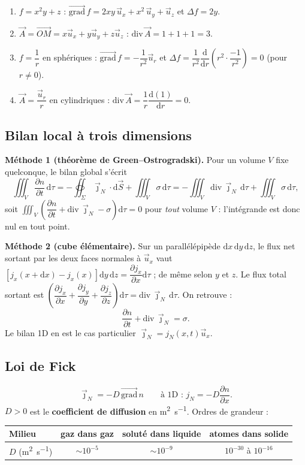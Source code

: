 \documentclass[11pt,a4paper]{article}
\newcommand{\vect}[1]{\overrightarrow{#1}}
\newcommand{\jn}{\vec{\jmath}_N}
\newcommand{\grad}{\vect{\mathrm{grad}}\,}
\renewcommand{\div}{\mathrm{div}\,}
\newcommand{\dd}{\mathrm{d}}
\newcommand{\ux}{\vec{u}_x}
\newcommand{\ur}{\vec{u}_r}
\newcommand{\pd}[2]{\dfrac{\partial #1}{\partial #2}}
\begin{document}
\begin{exemple}[title={Savoir calculer : exemples}]
\begin{enumerate}[leftmargin=1.5em]
  \item $f=x^2y+z$ : $\grad f = 2xy\,\ux + x^2\,\vec u_y+\vec u_z$ et
        $\Delta f = 2y$.
  \item $\vec A = \vect{OM}=x\ux+y\vec u_y+z\vec u_z$ : $\div\vec A = 1+1+1=3$.
  \item $f=\dfrac{1}{r}$ en sphériques : $\grad f=-\dfrac{1}{r^2}\ur$ et
        $\Delta f = \dfrac{1}{r^2}\dfrac{\dd}{\dd r}\left(r^2\cdot\dfrac{-1}{r^2}\right)=0$
        (pour $r\neq 0$).
  \item $\vec A=\dfrac{\ur}{r}$ en cylindriques : $\div\vec A=\dfrac1r\dfrac{\dd(1)}{\dd r}=0$.
\end{enumerate}
\end{exemple}

\subsection{Bilan local à trois dimensions}

\begin{demo}[title={Démonstration : équation locale de conservation à 3D}]
\textbf{Méthode 1 (théorème de Green--Ostrogradski).} Pour un volume $V$ fixe quelconque,
le bilan global s'écrit
\[ \iiint_V \pd{n}{t}\,\dd\tau = -\oiint_\Sigma\jn\cdot\dd\vec S+\iiint_V\sigma\,\dd\tau
   = -\iiint_V \div\jn\,\dd\tau + \iiint_V\sigma\,\dd\tau, \]
soit $\iiint_V\left(\pd{n}{t}+\div\jn-\sigma\right)\dd\tau=0$ pour \emph{tout} volume $V$ :
l'intégrande est donc nul en tout point.

\textbf{Méthode 2 (cube élémentaire).} Sur un parallélépipède $\dd x\,\dd y\,\dd z$, le flux
net sortant par les deux faces normales à $\ux$ vaut
$[j_x(x+\dd x)-j_x(x)]\dd y\,\dd z=\pd{j_x}{x}\dd\tau$ ; de même selon $y$ et $z$. Le flux
total sortant est $\left(\pd{j_x}{x}+\pd{j_y}{y}+\pd{j_z}{z}\right)\dd\tau=\div\jn\,\dd\tau$.
On retrouve :
\[ \boxed{\pd{n}{t}+\div\jn=\sigma.} \]
Le bilan 1D en est le cas particulier $\jn=j_N(x,t)\ux$.
\end{demo}

\subsection{Loi de Fick}

\begin{formule}[title={Loi de Fick (loi phénoménologique)}]
\[ \boxed{\jn = -D\,\grad n} \qquad\text{à 1D : } j_N=-D\pd{n}{x}. \]
$D>0$ est le \textbf{coefficient de diffusion} en \si{\square\metre\per\second}.
Ordres de grandeur :
\begin{center}
\begin{tabular}{lccc}
\toprule
Milieu & gaz dans gaz & soluté dans liquide & atomes dans solide \\
\midrule
$D$ (\si{\square\metre\per\second}) & $\sim 10^{-5}$ & $\sim 10^{-9}$ & $10^{-30}$ à $10^{-16}$ \\
\bottomrule
\end{tabular}
\end{center}
\end{formule}
\end{document}
